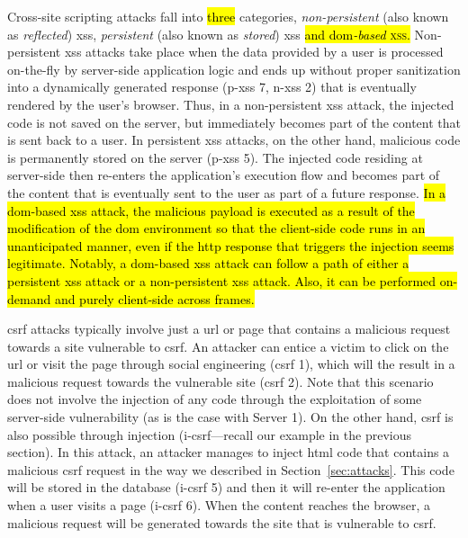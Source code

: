 \documentclass[10pt,journal,compsoc]{IEEEtran}
\newcommand{\hlc}[2][yellow]{ {\sethlcolor{#1} \hl{#2}} }
\begin{document}
Cross-site scripting
attacks fall into \hlc[yellow]{three} categories,
{\it non-persistent}
(also known as \emph{reflected}) {\sc xss},
{\it persistent} (also known as \emph{stored}) {\sc xss}
\hlc[yellow]{and {\sc dom}\textit{-based} \textsc{xss}.}
Non-persistent {\sc xss} attacks take place when the
data provided by a user is processed on-the-fly
by server-side application logic and ends up without proper sanitization
into a dynamically generated response ({\sc p-xss} 7, {\sc n-xss} 2)
that is eventually rendered by the user's browser.
Thus, in a non-persistent {\sc xss} attack, the injected code
is not saved on the server, but immediately becomes part of the
content that is sent back to a user.
In persistent {\sc xss} attacks, on the other hand,
malicious code is permanently stored on the server ({\sc p-xss} 5).
The injected code residing at server-side then re-enters the
application's execution flow and becomes part of the content that is
eventually sent to the user as part of a future response.
\hlc[yellow]{In a {\sc dom}-based {\sc xss} attack,
the malicious payload is executed as a result of
the modification of the {\sc dom}
environment so that the client-side code runs
in an unanticipated manner,
even if the {\sc http} response that
triggers the injection seems legitimate.
Notably,
a {\sc dom}-based {\sc xss} attack
can follow a path of either a persistent {\sc xss}
attack or a non-persistent {\sc xss} attack.
Also,
it can be performed on-demand and purely client-side
across frames.}

{\sc csrf} attacks typically involve just a
{\sc url} or page that contains a malicious request towards
a site vulnerable to {\sc csrf}.
An attacker can entice a victim to click on the {\sc url} or visit the page
through social engineering ({\sc csrf} 1), which will the result in a malicious
request towards the vulnerable site ({\sc csrf} 2).
Note that this scenario does not involve the injection of any code through the
exploitation of some server-side vulnerability (as is the case with Server 1).
On the other hand, {\sc csrf} is also possible through injection
({\sc i-csrf}---recall our example in the previous section).
In this attack, an attacker
manages to inject {\sc html} code that contains
a malicious {\sc csrf} request in the way we described in
Section~\ref{sec:attacks}.
This code will be stored
in the database ({\sc i-csrf} 5)
and then it will re-enter the application when
a user visits a page ({\sc i-csrf} 6). When the
content reaches the browser, a malicious request will be generated
towards the site that is vulnerable to {\sc csrf}.
\end{document}

